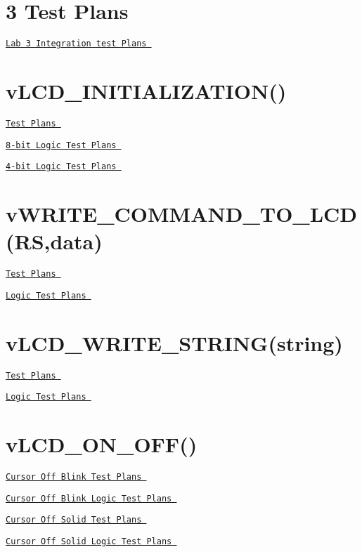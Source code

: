 \hypertarget{_test_plans_Lab}{}\section{3 Test Plans}\label{_test_plans_Lab}
\href{LAB3_TEST_PLANS.pdf}{\tt Lab 3 Integration test Plans }\hypertarget{_test_plans_initialization}{}\section{v\-L\-C\-D\-\_\-\-I\-N\-I\-T\-I\-A\-L\-I\-Z\-A\-T\-I\-O\-N()}\label{_test_plans_initialization}
\href{vLCD_INITIALIZATION_TESTPLAN.pdf}{\tt Test Plans } \par
 \href{vLCD_INITIALIZATION_8bit_LOGIC.pdf}{\tt 8-\/bit Logic Test Plans } \par
 \href{vLCD_INITIALIZATION_4bit_LOGIC.pdf}{\tt 4-\/bit Logic Test Plans }\hypertarget{_test_plans_command}{}\section{v\-W\-R\-I\-T\-E\-\_\-\-C\-O\-M\-M\-A\-N\-D\-\_\-\-T\-O\-\_\-\-L\-C\-D(\-R\-S,data)}\label{_test_plans_command}
\href{vWRITE_COMMAND_TO_LCD_TESTPLAN.pdf}{\tt Test Plans } \par
 \href{vWRITE_COMMAND_TO_LCD_LOGIC.pdf}{\tt Logic Test Plans }\hypertarget{_test_plans_string}{}\section{v\-L\-C\-D\-\_\-\-W\-R\-I\-T\-E\-\_\-\-S\-T\-R\-I\-N\-G(string)}\label{_test_plans_string}
\href{vLCD_PRINT_STRING_TESTPLAN.pdf}{\tt Test Plans } \par
 \href{vLCD_PRINT_STRING_LOGIC.pdf}{\tt Logic Test Plans }\hypertarget{_test_plans_onoff}{}\section{v\-L\-C\-D\-\_\-\-O\-N\-\_\-\-O\-F\-F()}\label{_test_plans_onoff}
\href{vLCD_ON_OFF_CURSOR_OFF_BLINK_TESTPLAN.pdf}{\tt Cursor Off Blink Test Plans } \par
 \href{vLCD_ON_OFF_CURSOR_OFF_BLINK_LOGIC.pdf}{\tt Cursor Off Blink Logic Test Plans } \par
 \href{vLCD_ON_OFF_CURSOR_OFF_SOLID_TESTPLAN.pdf}{\tt Cursor Off Solid Test Plans } \par
 \href{vLCD_ON_OFF_CURSOR_OFF_SOLID_LOGIC.pdf}{\tt Cursor Off Solid Logic Test Plans } \par
